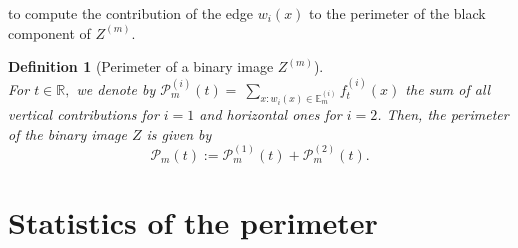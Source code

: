 \documentclass[12pt]{article}
\theoremstyle{Theorem}
\newtheorem{Definition}[Theorem]{Definition}
\begin{document}
to compute the contribution of the edge $w_i(x)$ to the perimeter of the black component of $Z^{\scriptscriptstyle (m)}$.
\begin{Definition}[Perimeter of a binary image $Z^{\scriptscriptstyle (m)}$]\label{defPerimetre}~\\
For $t\in \mathbb{R},$ we denote by $\mathcal{P}_{m}^{\scriptscriptstyle (i)}(t) =~\sum_{\scriptscriptstyle x: w_{i}(x) \in \mathbb{E}^{\scriptscriptstyle (i)}_{m}} f_{t}^{\scriptscriptstyle (i)}(x)$ the  sum of all vertical contributions for $i = 1$ and horizontal ones for $i = 2$. Then, the perimeter of the binary image $Z$ is given by
\begin{equation}
\mathcal{P}_{m}(t) := \mathcal{P}_{m}^{\scriptscriptstyle (1)}(t) + \mathcal{P}_{m}^{\scriptscriptstyle (2)}(t).
 \label{eq:6}
\end{equation}
\end{Definition}
\section{Statistics of the perimeter} 
\end{document}
